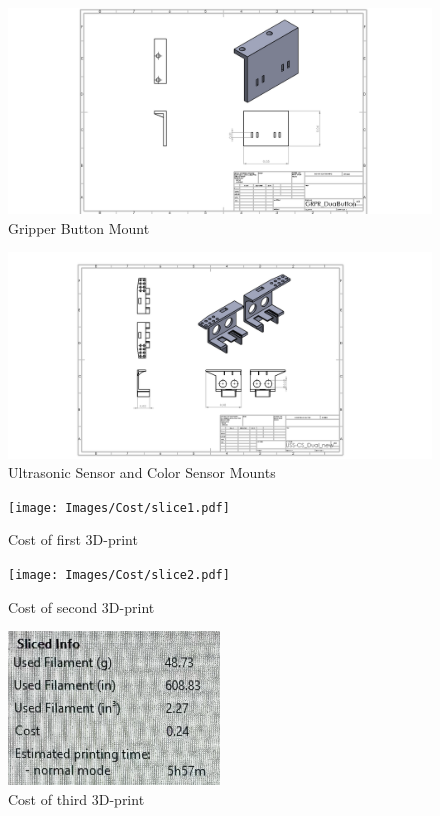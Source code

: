 \documentclass[12pt]{report}
\begin{document}
\begin{figure}[H]
    \centering
    \includegraphics[width=1\textwidth]{Images/3D prints/GRPR_DualButton_new.PNG}
    \caption{Gripper Button Mount}
    \label{fig:GRPR_DualButton}
\end{figure}

\begin{figure}[H]
    \centering
    \includegraphics[width=1\textwidth]{Images/3D prints/USS-CS_Dual_new.PNG}
    \caption{Ultrasonic Sensor and Color Sensor Mounts}
    \label{fig:USS-CS_Dual}
\end{figure}

\begin{figure}[H]
    \centering
    \texttt{[image: Images/Cost/slice1.pdf]}
    \caption{Cost of first 3D-print}
    \label{fig:printcost1}
\end{figure}

\begin{figure}[H]
    \centering
    \texttt{[image: Images/Cost/slice2.pdf]}
    \caption{Cost of second 3D-print}
    \label{fig:printcost2}
\end{figure}

\begin{figure}[H]
    \centering
    \includegraphics[width=0.5\textwidth]{Images/Cost/slice3.pdf}
    \caption{Cost of third 3D-print}
    \label{fig:printcost3}
\end{figure}
\end{document}

